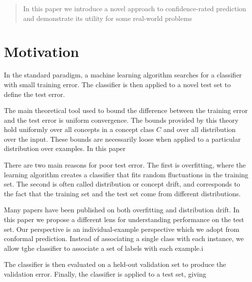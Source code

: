 \documentclass{article}
\begin{document}
\printAffiliationsAndNotice{\icmlEqualContribution} %

\begin{abstract}
In this paper we introduce a novel approach to confidence-rated
prediction and demonstrate its utility for some real-world problems
\end{abstract}

\newcommand{\cC}{{\cal C}}
\newcommand{\cD}{{\cal D}}
\newcommand{\cT}{{\cal T}}
\newcommand{\cN}{{\cal N}}
\newcommand{\cA}{{\cal A}}
\newcommand{\cE}{{\cal E}}
\newcommand{\cF}{{\cal F}}
\newcommand{\cX}{{\cal X}}
\newcommand{\cY}{{\cal Y}}
\renewcommand{\Pr}[2]{\mbox{Pr}_{#1}\left[ #2 \right]}

\section{Motivation}
\label{sec:Motivation}


In the standard paradigm, a machine learning algorithm searches for a
classifier with small training error. The classifier is then applied
to a novel test set to define the test error.

The main theoretical tool used to bound the difference between the
training error and the test error is uniform convergence. The bounds
provided by this theory hold uniformly over all concepts in a concept
class $C$ and over all distribution over the input. These bounds are
necessarily loose when applied to a particular distribution over
examples. In this paper 

There are two main reasons for poor test error. The first is
overfitting, where the learning algorithm creates a classifier that
fits random fluctuations in the training set. The second is often
called distribution or concept drift, and corresponds to the fact that
the training set and the test set come from different distributions.

Many papers have been published on both overfitting and distribution
drift. In this paper we propose a different lens for understanding
performance on the test set. Our perspective is an individual-example
perspective which we adopt from conformal prediction. Instead of
associating a single class with each instance, we allow tghe
classifier to associate a set of labels with each example.i

The classifier is then evaluated
on a held-out validation set to produce the validation error. Finally, the classifier is
applied to a test set, giving 
\end{document}
